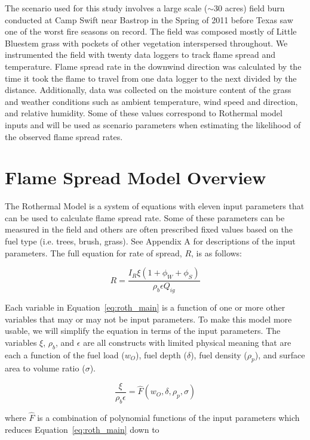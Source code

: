 \documentclass[11pt]{article}
\begin{document}
The scenario used for this study involves a large scale ($\sim$30 acres) field burn conducted at Camp Swift near Bastrop in the Spring of 2011 before Texas saw one of the worst fire seasons on record. The field was composed mostly of Little Bluestem grass with pockets of other vegetation interspersed throughout. We instrumented the field with twenty data loggers to track flame spread and temperature. Flame spread rate in the downwind direction was calculated by the time it took the flame to travel from one data logger to the next divided by the distance. Additionally, data was collected on the moisture content of the grass and weather conditions such as ambient temperature, wind speed and direction, and relative humidity. Some of these values correspond to Rothermal model inputs and will be used as scenario parameters when estimating the likelihood of the observed flame spread rates.


\section{Flame Spread Model Overview}

The Rothermal Model is a system of equations with eleven input parameters that can be used to calculate flame spread rate. Some of these parameters can be measured in the field and others are often prescribed fixed values based on the fuel type (i.e. trees, brush, grass). See Appendix A for descriptions of the input parameters. The full equation for rate of spread, $R$, is as follows:

\begin{equation}
R = \frac{I_R\xi(1+\phi_W+\phi_S)}{\rho_b\epsilon Q_{ig}}
\label{eq:roth_main}
\end{equation}

Each variable in Equation~\ref{eq:roth_main} is a function of one or more other variables that may or may not be input parameters. To make this model more usable, we will simplify the equation in terms of the input parameters. The variables $\xi$, $\rho_b$, and $\epsilon$ are all constructs with limited physical meaning that are each a function of the fuel load ($w_O$), fuel depth ($\delta$), fuel density ($\rho_p$), and surface area to volume ratio ($\sigma$). 

\begin{equation}
\frac{\xi}{\rho_b\epsilon} = \hat{F}(w_O, \delta, \rho_p, \sigma)
\label{eq:roth_fun}
\end{equation}

\noindent where $\hat{F}$ is a combination of polynomial functions of the input parameters which reduces Equation~\ref{eq:roth_main} down to
\end{document}
